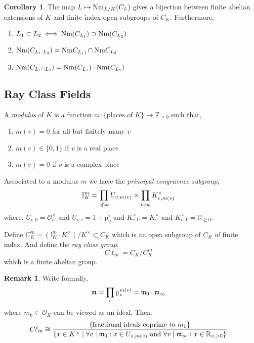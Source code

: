 \documentclass[12pt]{extarticle}
\newcommand{\divides}{\mid}
\newcommand{\ndivides}{\centernot \mid}
\newcommand{\Z}{\mathbb{Z}}
\newcommand{\R}{\mathbb{R}}
\newcommand{\ints}[1]{\mathcal{O}_{#1}}
\newcommand{\idele}[1]{\mathbb{I}_{#1}}
\theoremstyle{definition}
\newtheorem{corollary}[theorem]{Corollary}
\newtheorem{remark}[theorem]{Remark}
\newenvironment{definition}[1][Definition:]{\begin{trivlist}
\item[\hskip \labelsep {\bfseries #1}]}{\end{trivlist}}
\begin{document}
\begin{corollary}
The map $L \mapsto \mathrm{Nm}_{L/K}(C_L)$ gives a bijection between finite abelian extensions of $K$ and finite index open subgroups of $C_K$. Furthermore,
\begin{enumerate}
\item $L_1 \subset L_2 \iff \mathrm{Nm}(C_{L_1}) \supset \mathrm{Nm}(C_{L_2})$
\item $\mathrm{Nm}(C_{L_1 \cdot L_2}) = \mathrm{Nm}{C_{L_1)}} \cap \mathrm{Nm}{C_{L_2}}$
\item $\mathrm{Nm}(C_{L_1 \cap L_2}) = \mathrm{Nm}(C_{L_1}) \cdot \mathrm{Nm}(C_{L_2})$
\end{enumerate} 
\end{corollary}

\subsection{Ray Class Fields}

\newcommand{\p}{\mathrm{p}}
\newcommand{\Cl}{C\ell}

\begin{definition}
A \textit{modulus} of $K$ is a function $m : \{ \text{places of } K \} \to \Z_{\ge 0}$ such that,
\begin{enumerate}
\item $m(v) = 0$ for all but finitely many $v$
\item $m(v) \in \{0, 1\}$ if $v$ is a real place
\item $m(v) = 0$ if $v$ is a complex place
\end{enumerate}
\end{definition}

\begin{definition}
Associated to a modulus $m$ we have the \textit{principal congruence subgroup},
\[ \idele{K}^m = \prod_{v \ndivides \infty} U_{v,m(v)} \times \prod_{v \divides \infty} K_{v, m(v)}^\times \]
where, $U_{v,0} = \ints{v}^\times$ and $U_{v,i} = 1 + \p_v^i$ and $K_{v,0}^\times = K_v^\times$ and $K_{v,1}^\times = \R_{\ge 0}$. 
\end{definition}

\begin{definition}
Define $C_K^m = (\idele{K}^m \cdot K^\times) / K^\times \subset C_K$ which is an open subgroup of $C_K$ of finite index. And define the \textit{ray class group},
\[ \Cl_m = C_K / C_K^m \]
which is a finite abelian group. 
\end{definition}

\begin{remark}
Write formally,
\[ \m = \prod_{v} \p_v^{m(v)} = \m_0 \cdot \m_{\infty} \]
where $m_0 \subset \ints{K}$ can be viewed as an ideal. Then,
\[ \Cl_m \cong \frac{\{ \text{fractional ideals coprime to } m_0 \}}{\{ x \in K^\times \mid \forall v \divides \m_0 : x \in U_{v,m(v)} \text{ and } \forall v \divides \m_{\infty} : x \in \R_{v, > 0} \}} \]
\end{remark}
\end{document}
